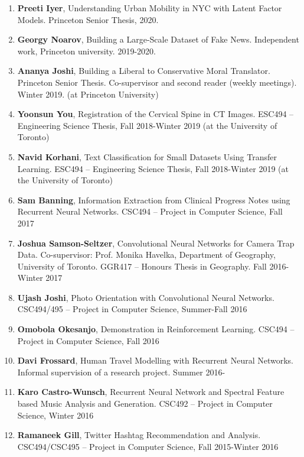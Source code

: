 \documentclass[letterpaper,11pt]{article}
\begin{document}
\begin{enumerate}
	\textbf{Max Piasevoli}, Generative Adversarial Networks for Model Checking. Princeton Senior Independent Work, 2020.
\item
	\textbf{Preeti Iyer}, Understanding Urban Mobility in NYC with Latent Factor Models. Princeton  Senior Thesis, 2020.
\item
	\textbf{Georgy Noarov}, Building a Large-Scale Dataset of Fake News. Independent work, Princeton university. 2019-2020.
\item
	\textbf{Ananya Joshi}, Building a Liberal to Conservative Moral Translator. Princeton Senior Thesis. Co-supervisor and second reader (weekly meetings). Winter 2019.  (at Princeton University)
\item
	\textbf{Yoonsun You}, Registration of the Cervical Spine in CT Images. ESC494 -- Engineering Science Thesis, Fall 2018-Winter 2019 (at the University of Toronto)
\item
	\textbf{Navid Korhani}, Text Classification for Small Datasets Using Transfer Learning. ESC494 -- Engineering Science Thesis, Fall 2018-Winter 2019 (at the University of Toronto)
\item
	\textbf{Sam Banning}, Information Extraction from Clinical Progress Notes using Recurrent Neural Networks. CSC494 -- Project in Computer Science, Fall 2017

\item
	\textbf{Joshua Samson-Seltzer}, Convolutional Neural Networks for Camera Trap Data.  Co-supervisor: Prof. Monika Havelka, Department of Geography, University of Toronto. GGR417 -- Honours Thesis in Geography. Fall 2016-Winter 2017
\item
	\textbf{Ujash Joshi}, Photo Orientation with Convolutional Neural Networks. CSC494/495 -- Project in Computer Science, Summer-Fall 2016
\item
	\textbf{Omobola Okesanjo}, Demonstration in Reinforcement Learning. CSC494 -- Project in Computer Science, Fall 2016
\item
	\textbf{Davi Frossard}, Human Travel Modelling with Recurrent Neural Networks. Informal supervision of a research project. Summer 2016-
\item
	\textbf{Karo Castro-Wunsch}, Recurrent Neural Network and Spectral Feature based Music Analysis and Generation. CSC492 -- Project in Computer Science, Winter 2016	
\item
	\textbf{Ramaneek Gill}, Twitter Hashtag Recommendation and Analysis. CSC494/CSC495 -- Project in Computer Science, Fall 2015-Winter 2016
\end{enumerate}
\end{document}
